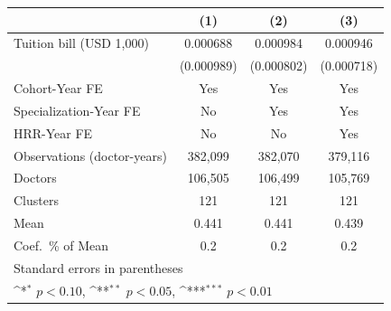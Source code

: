 {
\def\sym#1{\ifmmode^{#1}\else\(^{#1}\)\fi}
\begin{tabular}{l*{3}{c}}
\hline\hline
                    &\multicolumn{1}{c}{(1)}         &\multicolumn{1}{c}{(2)}         &\multicolumn{1}{c}{(3)}         \\
\hline
Tuition bill (USD 1,000)&    0.000688         &    0.000984         &    0.000946         \\
                    &  (0.000989)         &  (0.000802)         &  (0.000718)         \\
[1em]
Cohort-Year FE      &         Yes         &         Yes         &         Yes         \\
[1em]
Specialization-Year FE&          No         &         Yes         &         Yes         \\
[1em]
HRR-Year FE         &          No         &          No         &         Yes         \\
\hline
Observations (doctor-years)&     382,099         &     382,070         &     379,116         \\
Doctors             &     106,505         &     106,499         &     105,769         \\
Clusters            &         121         &         121         &         121         \\
Mean                &       0.441         &       0.441         &       0.439         \\
Coef.\ \% of Mean   &         0.2         &         0.2         &         0.2         \\
\hline\hline
\multicolumn{4}{l}{\footnotesize Standard errors in parentheses}\\
\multicolumn{4}{l}{\footnotesize \sym{*} \(p<0.10\), \sym{**} \(p<0.05\), \sym{***} \(p<0.01\)}\\
\end{tabular}
}
